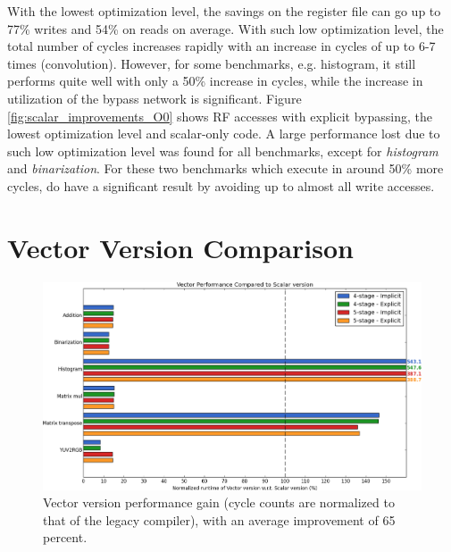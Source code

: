 With the lowest optimization level, the savings on the register file can go up to 77\% writes and 54\% on reads on average. With such low optimization level, the total number of cycles increases rapidly with an increase in cycles of up to 6-7 times (convolution). However, for some benchmarks, e.g. histogram, it still performs quite well with only a 50\% increase in cycles, while the increase in utilization of the bypass network is significant. Figure \ref{fig:scalar_improvements_O0} shows RF accesses with explicit bypassing, the lowest optimization level and scalar-only code. A large performance lost due to such low optimization level was found for all benchmarks, except for \emph{histogram} and \emph{binarization}. For these two benchmarks which execute in around 50\% more cycles, do have a significant result by avoiding up to almost all write accesses.



\section{Vector Version Comparison}

\begin{figure}[b!]
\centering
\hspace*{-.12in}
\includegraphics[width=\textwidth]{figures/stats/vector_cycles}
\caption{Vector version performance gain (cycle counts are normalized to that of the legacy compiler), with an average improvement of 65 percent.}
\label{fig:vector_scalar_cmp}
\end{figure}


